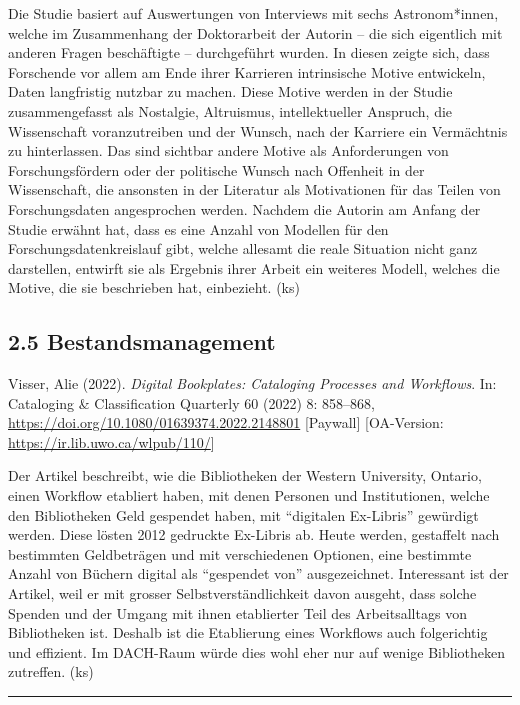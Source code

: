 \documentclass[a4paper,
fontsize=11pt,
oneside,
numbers=noperiodatend,
parskip=half-,
bibliography=totoc,
final
]{scrartcl}
\begin{document}
Die Studie basiert auf Auswertungen von Interviews mit sechs
Astronom*innen, welche im Zusammenhang der Doktorarbeit der Autorin --
die sich eigentlich mit anderen Fragen beschäftigte -- durchgeführt
wurden. In diesen zeigte sich, dass Forschende vor allem am Ende ihrer
Karrieren intrinsische Motive entwickeln, Daten langfristig nutzbar zu
machen. Diese Motive werden in der Studie zusammengefasst als Nostalgie,
Altruismus, intellektueller Anspruch, die Wissenschaft voranzutreiben
und der Wunsch, nach der Karriere ein Vermächtnis zu hinterlassen. Das
sind sichtbar andere Motive als Anforderungen von Forschungsfördern oder
der politische Wunsch nach Offenheit in der Wissenschaft, die ansonsten
in der Literatur als Motivationen für das Teilen von Forschungsdaten
angesprochen werden. Nachdem die Autorin am Anfang der Studie erwähnt
hat, dass es eine Anzahl von Modellen für den Forschungsdatenkreislauf
gibt, welche allesamt die reale Situation nicht ganz darstellen,
entwirft sie als Ergebnis ihrer Arbeit ein weiteres Modell, welches die
Motive, die sie beschrieben hat, einbezieht. (ks)

\hypertarget{bestandsmanagement}{%
\subsection{2.5 Bestandsmanagement}\label{bestandsmanagement}}

Visser, Alie (2022). \emph{Digital Bookplates: Cataloging Processes and
Workflows}. In: Cataloging \& Classification Quarterly 60 (2022) 8:
858--868, \url{https://doi.org/10.1080/01639374.2022.2148801}
{[}Paywall{]} {[}OA-Version: \url{https://ir.lib.uwo.ca/wlpub/110/}{]}

Der Artikel beschreibt, wie die Bibliotheken der Western University,
Ontario, einen Workflow etabliert haben, mit denen Personen und
Institutionen, welche den Bibliotheken Geld gespendet haben, mit
\enquote{digitalen Ex-Libris} gewürdigt werden. Diese lösten 2012
gedruckte Ex-Libris ab. Heute werden, gestaffelt nach bestimmten
Geldbeträgen und mit verschiedenen Optionen, eine bestimmte Anzahl von
Büchern digital als \enquote{gespendet von} ausgezeichnet. Interessant
ist der Artikel, weil er mit grosser Selbstverständlichkeit davon
ausgeht, dass solche Spenden und der Umgang mit ihnen etablierter Teil
des Arbeitsalltags von Bibliotheken ist. Deshalb ist die Etablierung
eines Workflows auch folgerichtig und effizient. Im DACH-Raum würde dies
wohl eher nur auf wenige Bibliotheken zutreffen. (ks)

\begin{center}\rule{0.5\linewidth}{0.5pt}\end{center}
\pagebreak
\end{document}
